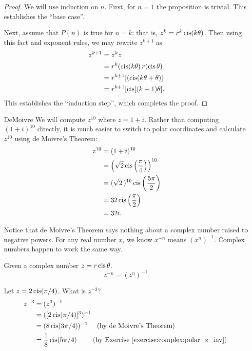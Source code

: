 \begin{proof}
We will use induction  on $n$. First, for $n=1$ the proposition
is trivial. This establishes the ``base case''. 

Next, assume that $P(n)$ is true for $n=k$: that is, 
$z^k = r^k \operatorname{cis}(k \theta)$. Then using this fact and exponent rules, we may rewrite $z^{k+1}$ as
\begin{align*}
z^{k+1} & =z^{k}z\\
 & =r^{k}(\operatorname{cis}(k\theta)\,r(\operatorname{cis}\theta)\\
 & =r^{k+1}[(\operatorname{cis}(k\theta + \theta)]\\
 & =r^{k+1}[\operatorname{cis}[(k+1)\theta].
\end{align*}
This establishes the ``induction step'', which completes the proof.
\end{proof}

\begin{example}{DeMoivre} We will compute $z^{10}$ where $z=1+i$. Rather than computing $(1+i)^{10}$ directly, it
is much easier to switch to polar coordinates and calculate $z^{10}$
using de Moivre's Theorem: \begin{align*}
z^{10} & =(1+i)^{10}\\
 & =\left(\sqrt{2}\operatorname{cis}\left(\frac{\pi}{4}\right)\right)^{10}\\
 & =(\sqrt{2}\,)^{10}\operatorname{cis}\left(\frac{5\pi}{2}\right)\\
 & =32\operatorname{cis}\left(\frac{\pi}{2}\right)\\
 & =32i.\end{align*}
 \end{example}
 
\noindent
Notice that de Moivre's Theorem says nothing about a complex number raised to negative powers.  For any real number $x$, we know $x^{-n}$ means $(x^n)^{-1}$.  Complex numbers happen to work the same way.
 
 \begin{defn} \label{polar_negpower}
 Given a complex number $z=r\operatorname{cis}\theta$, 
 \[ z^{-n} = (z^n)^{-1}. \]
 \end{defn}
 
 \begin{example}{5}
Let $z = 2\operatorname{cis}(\pi/4)$.  What is $z^{-3}$?  
 \begin{align*}
  z^{-3} & = (z^3)^{-1} \\
  & = ([2\cis(\pi/4)]^3)^{-1} \\
  & = (8\cis(3\pi/4))^{-1} \quad \mbox{ (by de Moivre's Theorem) } \\
  & = \frac{1}{8}\cis(5\pi/4) \qquad \mbox{ (by Exercise~\ref{exercise:complex:polar_z_inv}) } 
  \end{align*}
  \end{example}
 
